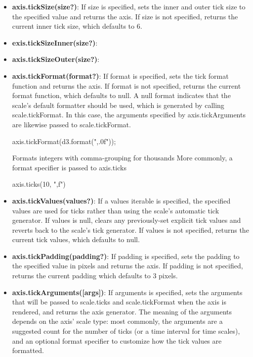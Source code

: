 \documentclass{report}
\begin{document}
\begin{itemize}
\begin{itemize}
                \item \textbf{axis.tickSize(size?)}: If size is specified, sets the inner and outer tick size to the specified value and returns the axis. If size is not specified, returns the current inner tick size, which defaults to 6.
                \item \textbf{exis.tickSizeInner(size?)}: 
                \item \textbf{axis.tickSizeOuter(size?)}:
                \item \textbf{axis.tickFormat(format?)}: If format is specified, sets the tick format function and returns the axis. If format is not specified, returns the current format function, which defaults to null. A null format indicates that the scale’s default formatter should be used, which is generated by calling scale.tickFormat. In this case, the arguments specified by axis.tickArguments are likewise passed to scale.tickFormat.
                    \bigbreak \noindent 
                    \begin{jscode}
                    axis.tickFormat(d3.format(",.0f"));
                    \end{jscode}
                    \bigbreak \noindent 
                    Formats integers with comma-grouping for thousands
                    \bigbreak \noindent 
                    More commonly, a format specifier is passed to axis.ticks
                    \bigbreak \noindent 
                    \begin{jscode}
                    axis.ticks(10, ",f")
                    \end{jscode}
                \item \textbf{axis.tickValues(values?)}: If a values iterable is specified, the specified values are used for ticks rather than using the scale’s automatic tick generator. If values is null, clears any previously-set explicit tick values and reverts back to the scale’s tick generator. If values is not specified, returns the current tick values, which defaults to null.
                \item \textbf{axis.tickPadding(padding?)}: If padding is specified, sets the padding to the specified value in pixels and returns the axis. If padding is not specified, returns the current padding which defaults to 3 pixels.
                \item \textbf{axis.tickArguments([args])}: If arguments is specified, sets the arguments that will be passed to scale.ticks and scale.tickFormat when the axis is rendered, and returns the axis generator. The meaning of the arguments depends on the axis’ scale type: most commonly, the arguments are a suggested count for the number of ticks (or a time interval for time scales), and an optional format specifier to customize how the tick values are formatted.

\end{itemize}
\end{itemize}
\end{document}
